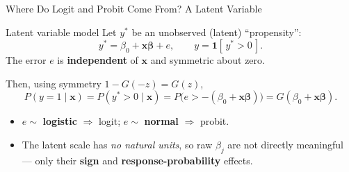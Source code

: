 \documentclass[aspectratio=169, 12pt]{beamer}
\newcommand{\xbeta}{\mathbf{x}\boldsymbol{\beta}}   %
\begin{document}
\begin{frame}[shrink=8]{Where Do Logit and Probit Come From? A Latent Variable}

  \begin{definitionbox}{Latent variable model}
    Let $y^{*}$ be an unobserved (latent) ``propensity'':
    \[
      y^{*} = \beta_0 + \xbeta + e, \qquad y = \mathbf{1}[\,y^{*} > 0\,] .
    \]
    The error $e$ is \textbf{independent} of $\mathbf{x}$ and symmetric about zero.
  \end{definitionbox}

  \smallskip

  Then, using symmetry $1 - G(-z) = G(z)$,
  \[
    P(y=1\mid\mathbf{x}) = P(y^{*}>0\mid\mathbf{x})
      = P\!\big(e > -(\beta_0+\xbeta)\big) = G(\beta_0+\xbeta).
  \]

  \begin{keybox}
    \small
    \begin{itemize}
      \item $e \sim$ \textbf{logistic} $\Rightarrow$ logit; \quad
            $e \sim$ \textbf{normal} $\Rightarrow$ probit.
      \item The latent scale has \emph{no natural units}, so raw $\beta_j$ are not
        directly meaningful --- only their \textbf{sign} and
        \textbf{response-probability} effects.
    \end{itemize}
  \end{keybox}

\end{frame}
\end{document}
